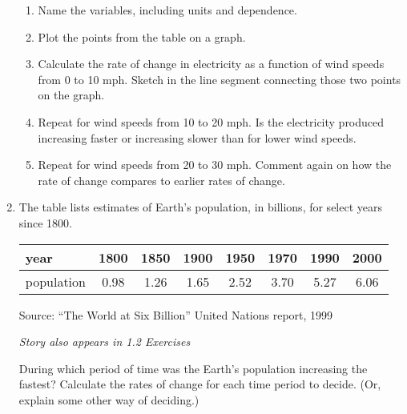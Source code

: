 \begin{enumerate}
\begin{enumerate}
\item Name the variables, including units and dependence.
\item Plot the points from the table on a graph.
\item Calculate the rate of change in electricity as a function of wind speeds from 0 to 10 mph.  Sketch in the line segment connecting those two points on the graph.   
\item Repeat for wind speeds from 10 to 20 mph.  Is the electricity produced increasing faster or increasing slower than for lower wind speeds.
\item Repeat for wind speeds from 20 to 30 mph.  Comment again on how the rate of change compares to earlier rates of change.
\end{enumerate} 

\item The table lists estimates of Earth's population, in billions, for select years since 1800.   
\begin{center}
\begin{tabular} {|l |c |c |c |c |c |c |c |} \hline
year & 1800 & 1850 & 1900 & 1950 & 1970 & 1990 & 2000 \\ \hline
population & 0.98 & 1.26 & 1.65 & 2.52 & 3.70 & 5.27 & 6.06  \\ \hline
\end{tabular}
\end{center}
\hfill \begin{footnotesize} Source:  ``The World at Six Billion'' United Nations report, 1999\end{footnotesize}

\hfill \emph{Story also appears in 1.2 Exercises}

During which period of time was the Earth's population increasing the fastest?  Calculate the rates of change for each time period to decide.  (Or, explain some other way of deciding.)


\end{enumerate}

